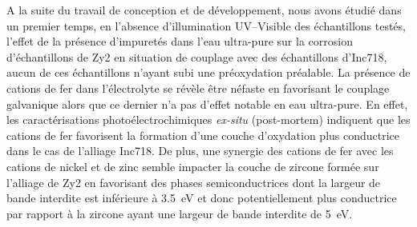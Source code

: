 \begin{refsection}


A la suite du travail de conception et de développement, nous avons étudié dans un premier temps, en l’absence
d’illumination UV--Visible des échantillons testés, l’effet de la présence d’impuretés dans l’eau ultra-pure sur la
corrosion d’échantillons de Zy2 en situation de couplage avec des échantillons d’Inc718, aucun de ces échantillons
n’ayant subi une préoxydation préalable. La présence de cations de fer dans l’électrolyte se révèle être néfaste en
favorisant le couplage galvanique alors que ce dernier n’a pas d’effet notable en eau ultra-pure. En effet, les
caractérisations photoélectrochimiques \emph{ex-situ} (post-mortem) indiquent que les cations de fer favorisent la formation
d’une couche d’oxydation plus conductrice dans le cas de l’alliage Inc718. De plus, une synergie des cations de fer avec
les cations de nickel et de zinc semble impacter la couche de zircone formée sur l’alliage de Zy2 en favorisant des
phases semiconductrices dont la largeur de bande interdite est inférieure à 3.5~eV et donc potentiellement plus
conductrice par rapport à la zircone ayant une largeur de bande interdite de 5~eV.


\end{refsection}
